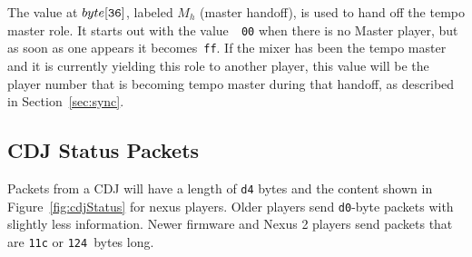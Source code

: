 \documentclass[11pt]{article}
\begin{document}
The value at $byte[{\tt 36}]$, labeled $M_h$ (master handoff), is used
to hand off the tempo master role. It starts out with the value~{\tt
  00} when there is no Master player, but as soon as one appears it
becomes~{\tt ff}. If the mixer has been the tempo master and it is
currently yielding this role to another player, this value will be the
player number that is becoming tempo master during that handoff, as
described in Section~\ref{sec:sync}.

\subsection{CDJ Status Packets}

Packets from a CDJ will have a length of {\tt d4} bytes and the
content shown in Figure~\ref{fig:cdjStatus} for nexus players. Older
players send {\tt d0}-byte packets with slightly less information.
Newer firmware and Nexus 2 players send packets that are {\tt 11c} or
{\tt 124}~bytes long.
\end{document}
